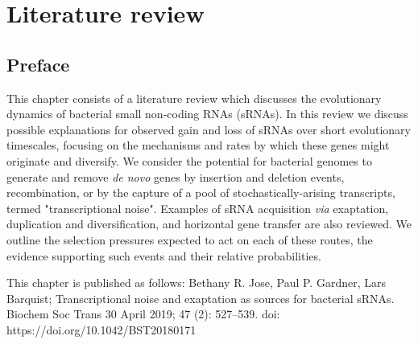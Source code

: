\label{chap:lit_review}
\chapter{Literature review}
\section{Preface}

This chapter consists of a literature review which discusses the evolutionary dynamics of bacterial small non-coding RNAs (sRNAs). In this review we discuss possible explanations for observed gain and loss of sRNAs over short evolutionary timescales, focusing on the mechanisms and rates by which these genes might originate and diversify. We consider the potential for bacterial genomes to generate and remove \textit{de novo} genes by insertion and deletion events, recombination, or by the capture of a pool of stochastically-arising transcripts, termed "transcriptional noise". Examples of sRNA acquisition \textit{via} exaptation, duplication and diversification, and horizontal gene transfer are also reviewed. We outline the selection pressures expected to act on each of these routes, the evidence supporting such events and their relative probabilities.

This chapter is published as follows:
Bethany R. Jose, Paul P. Gardner, Lars Barquist; Transcriptional noise and exaptation as sources for bacterial sRNAs. Biochem Soc Trans 30 April 2019; 47 (2): 527–539. doi: https://doi.org/10.1042/BST20180171

